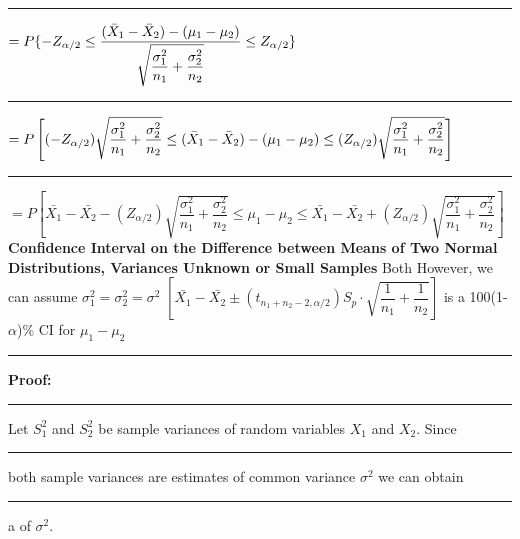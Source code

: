 \documentclass[]{article}
\begin{document}
\newline
\newline\Large\rule{4.3cm}{0pt} $ = P \{ -Z_{\alpha\\/2} \le    \dfrac{  (  \bar{X}_1 - \bar{X}_2 )  -  (\mu_1 - \mu_2)   }{\sqrt{\dfrac{\sigma^2_1}{n_1} + \dfrac{\sigma^2_2}{n_2} }}    \le Z_{\alpha\\/2}  \}$
\newline
\newline
\newline\Large\rule{3.3cm}{0pt} $ = P \left[  (-Z_{\alpha\\/2} ) \sqrt{\dfrac{\sigma^2_1}{n_1} + \dfrac{\sigma^2_2}{n_2} }  \le  (  \bar{X}_1 - \bar{X}_2 )  -  (\mu_1 - \mu_2)  \le (Z_{\alpha\\/2}) \sqrt{\dfrac{\sigma^2_1}{n_1} + \dfrac{\sigma^2_2}{n_2} }  \right]$
\newline\newline
\newline\Large\rule{2.3cm}{0pt} $ = P \left[   \bar{X_{1}} - \bar{X_{2}} - \left( Z_{\alpha / 2}  \right) \sqrt{\dfrac{\sigma^2_1}{n_1} + \dfrac{\sigma^2_2}{n_2}    }  \le  \mu_1 - \mu_2    \le   \bar{X_{1}} - \bar{X_{2}} + \left( Z_{\alpha / 2}  \right) \sqrt{\dfrac{\sigma^2_1}{n_1} + \dfrac{\sigma^2_2}{n_2}    }  \right]$
\newline
\newline
\newline
\Large\textbf{Confidence Interval on the Difference between Means of Two Normal Distributions, Variances Unknown or Small Samples}
\newline Both  However, we can assume $\sigma^2_1 = \sigma^2_2 =\sigma^2$
\newline
\newline
$\left[ \bar{X_{1}} - \bar{X_{2}} \pm \left( t_{n_{1}+ n_{2} -2 , \alpha / 2 }  \right) S_p \cdot  \sqrt{\dfrac{1}{n_1} + \dfrac{1}{n_2}    }      \right] $ is a 100(1-$\alpha$)$\%$ CI for $\mu_1 - \mu_2$ 
\newline 
\newline
\newline\Large\rule{3.0cm}{0pt} \textbf{Proof:}
\newline\Large\rule{3.0cm}{0pt} Let $S^2_1$ and $S^2_2$ be sample variances of random variables $X_1$ and $X_2$. Since 
\newline\Large\rule{3.0cm}{0pt} both sample variances are estimates of common variance $\sigma^2$ we can obtain
\newline\Large\rule{3.0cm}{0pt}  a    of $\sigma^2$.
\end{document}
